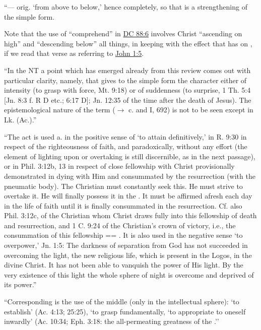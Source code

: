 \begin{compactdesc}
					\item[TDNT 4:12] \phantom{.}
						\begin{compactitem}
							\item ``--- orig. `from above to below,' hence completely, so that  is a strengthening of the simple form.
								\begin{compactitem}
									\item Note that the use of ``comprehend'' in \hyperref[DC88-6]{DC 88:6} involves Christ ``ascending on high'' and ``descending below'' all things, in keeping with the effect that  has on , if we read that verse as referring to \hyperref[JOHN-1-5]{John 1:5}.
								\end{compactitem}
							\item ``In the NT a point which has emerged already from this review comes out with particular clarity, namely, that  gives to the simple form the character either of intensity (to grasp with force, Mt. 9:18) or of suddenness (to surprise, 1 Th. 5:4 [Jn. 8:3 f. R D etc.; 6:17  D]; Jn. 12:35 of the time after the death of Jesus). The epistemological nature of the term ($\rightarrow$ c. and I, 692) is not to be seen except in Lk. (Ac.).''
							\item ``The act is used a. in the positive sense of `to attain definitively,' in R. 9:30 in respect of the righteousness of faith, and paradoxically, without any effort (the element of lighting upon or overtaking is still discernible, as in the next passage), or in Phil. 3:12b, 13 in respect of close fellowship with Christ provisionally demonstrated in dying with Him and consummated by the resurrection (with the pneumatic body). The Christian must constantly seek this. He must strive to overtake it. He will finally possess it in the . It must be affirmed afresh each day in the life of faith until it is finally consummated in the resurrection. Cf. also Phil. 3:12c, of the Christian whom Christ draws fully into this fellowship of death and resurrection, and 1 C. 9:24 of the Christian's crown of victory, i.e., the consummation of this fellowship == . It is also used in the negative sense `to overpower,' Jn. 1:5: The darkness of separation from God has not succeeded in overcoming the light, the new religious life, which is present in the Logos, in the divine Christ. It has not been able to vanquish the power of His light. By the very existence of this light the whole sphere of night is overcome and deprived of its power.''
							\item ``Corresponding is the use of the middle (only in the intellectual sphere): `to establish' (Ac. 4:13; 25:25), `to grasp fundamentally, `to appropriate to oneself inwardly' (Ac. 10:34; Eph. 3:18: the all-permeating greatness of the .''
						\end{compactitem}
				\end{compactdesc}
				
